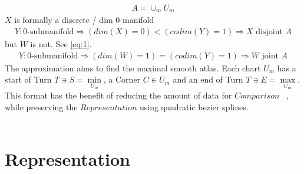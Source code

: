 \documentclass{report}
\begin{document}
\begin{align}
A = \cup_{m}U_{m}
\end{align}
$X$ is formally a discrete / dim 0-manifold
\begin{align}
Y: \text{0-submanifold} \Rightarrow (dim(X)=0)<(codim(Y)=1) \Rightarrow X \text{ disjoint } A
\end{align}
but $W$ is not. See \eqref{eq:1}.
\begin{align}
Y: \text{0-submanifold} \Rightarrow (dim(W)=1)=(codim(Y)=1) \Rightarrow W \text{ joint } A
\end{align}
The approximation aims to find the maximal smooth atlas. Each chart $U_{m}$ has a start of Turn $T \ni S = \min \limits _{U_{m}}$, a Corner $C \in U_{m}$ and an end of Turn $T \ni E = \max \limits _{U_{m}}$. This format has the benefit of reducing the amount of data for $Comparison$ ~\cite[Stopeight\_Comparator.tex]{Comparator}, while preserving the $Representation$ using quadratic bezier splines.\\\\

\chapter{Representation}
\end{document}

